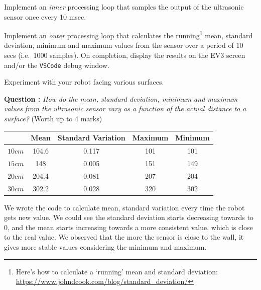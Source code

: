 \documentclass[hidelinks,a4paper,11pt]{article}
\newcounter{question}
\newcommand\myq{\refstepcounter{question}\thequestion}
\begin{document}
	\begin{todolist}
		\item Implement an \emph{inner} processing loop that samples the output of the ultrasonic sensor once every 10 msec.
		\item Implement an \emph{outer} processing loop that calculates the running\footnote{Here's how to calculate a `running' mean and standard deviation: \url{https://www.johndcook.com/blog/standard_deviation/}} mean, standard deviation, minimum and maximum values from the sensor over a period of 10 secs (i.e.\ 1000 samples).  On completion, display the results on the EV3 screen and/or the \texttt{VSCode} debug window.
		\item Experiment with your robot facing various surfaces.
	\end{todolist}
	
	{\bfseries Question \myq:}  \emph{How do the mean, standard deviation, minimum and maximum values from the ultrasonic sensor vary as a function of the \underline{actual} distance to a surface?} (Worth up to 4 marks)\\
	\begin{mdframed}
		\begin{center}
			\begin{tabular}{ | c | c | c | c | c |} \hline
				& \bf{Mean} & \bf{Standard Variation} & \bf{Maximum} & \bf{Minimum} \\ \hline
				\bf{$10cm$} & 104.6 & 0.117 & 101 & 101 \\ \hline
				\bf{$15cm$} & 148 & 0.005 & 151 & 149 \\ \hline
				\bf{$20cm$} & 204.4 & 0.081 & 207 & 204 \\ \hline
				\bf{$30cm$} & 302.2 & 0.028 & 320 & 302 \\ \hline
			\end{tabular}
		\end{center}
		We wrote the code to calculate mean, standard variation every time the robot gets new value. We could see the standard deviation starts decreasing towards to 0, and the mean starts increasing towards a more consistent value, which is close to the real value. We observed that the more the sensor is close to the wall, it gives more stable values considering the minimum and maximum.
	\end{mdframed}
	\vspace*{\baselineskip}
	
\end{document}
